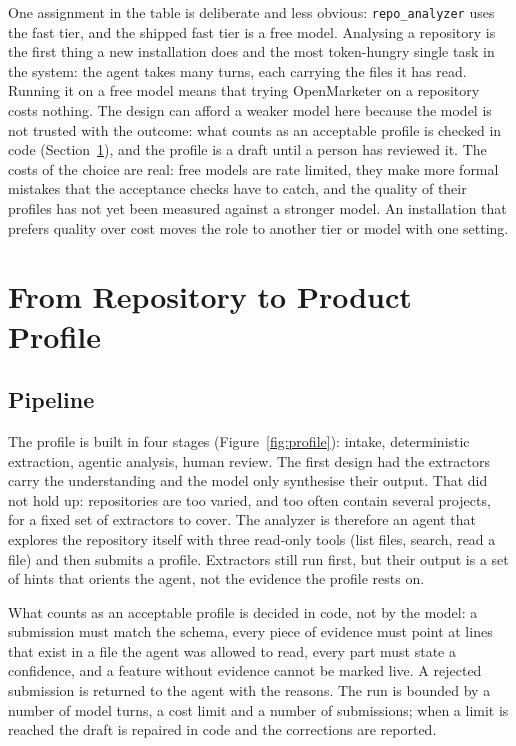 \documentclass[11pt,a4paper]{article}
\begin{document}
One assignment in the table is deliberate and less obvious: \texttt{repo\_analyzer} uses the fast tier, and the shipped fast tier is a free model. Analysing a repository is the first thing a new installation does and the most token-hungry single task in the system: the agent takes many turns, each carrying the files it has read. Running it on a free model means that trying OpenMarketer on a repository costs nothing. The design can afford a weaker model here because the model is not trusted with the outcome: what counts as an acceptable profile is checked in code (Section~\ref{sec:profile}), and the profile is a draft until a person has reviewed it. The costs of the choice are real: free models are rate limited, they make more formal mistakes that the acceptance checks have to catch, and the quality of their profiles has not yet been measured against a stronger model. An installation that prefers quality over cost moves the role to another tier or model with one setting.

\section{From Repository to Product Profile}\label{sec:profile}

\subsection{Pipeline}
The profile is built in four stages (Figure~\ref{fig:profile}): intake, deterministic extraction, agentic analysis, human review. The first design had the extractors carry the understanding and the model only synthesise their output. That did not hold up: repositories are too varied, and too often contain several projects, for a fixed set of extractors to cover. The analyzer is therefore an agent that explores the repository itself with three read-only tools (list files, search, read a file) and then submits a profile. Extractors still run first, but their output is a set of hints that orients the agent, not the evidence the profile rests on.

What counts as an acceptable profile is decided in code, not by the model: a submission must match the schema, every piece of evidence must point at lines that exist in a file the agent was allowed to read, every part must state a confidence, and a feature without evidence cannot be marked live. A rejected submission is returned to the agent with the reasons. The run is bounded by a number of model turns, a cost limit and a number of submissions; when a limit is reached the draft is repaired in code and the corrections are reported.
\end{document}
